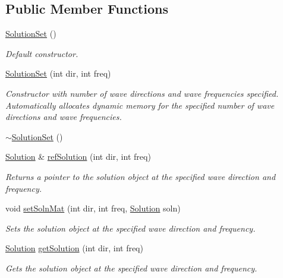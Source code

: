 \subsection*{Public Member Functions}
\begin{DoxyCompactItemize}
\item 
\hyperlink{classosea_1_1ofreq_1_1_solution_set_a0f7bf3b0ffbc11e1eea127614bf668a4}{Solution\-Set} ()
\begin{DoxyCompactList}\small\item\em Default constructor. \end{DoxyCompactList}\item 
\hyperlink{classosea_1_1ofreq_1_1_solution_set_ac4a508cd109ea0e7726aa47a3c868814}{Solution\-Set} (int dir, int freq)
\begin{DoxyCompactList}\small\item\em Constructor with number of wave directions and wave frequencies specified. Automatically allocates dynamic memory for the specified number of wave directions and wave frequencies. \end{DoxyCompactList}\item 
\hyperlink{classosea_1_1ofreq_1_1_solution_set_af016abf25e2e0ba50336449b12b88423}{$\sim$\-Solution\-Set} ()
\item 
\hyperlink{classosea_1_1ofreq_1_1_solution}{Solution} \& \hyperlink{classosea_1_1ofreq_1_1_solution_set_a5bbd01ec83ef72d924d13d9437407880}{ref\-Solution} (int dir, int freq)
\begin{DoxyCompactList}\small\item\em Returns a pointer to the solution object at the specified wave direction and frequency. \end{DoxyCompactList}\item 
void \hyperlink{classosea_1_1ofreq_1_1_solution_set_abfd970f3f5b875cdc193281c4a5f6f21}{set\-Soln\-Mat} (int dir, int freq, \hyperlink{classosea_1_1ofreq_1_1_solution}{Solution} soln)
\begin{DoxyCompactList}\small\item\em Sets the solution object at the specified wave direction and frequency. \end{DoxyCompactList}\item 
\hyperlink{classosea_1_1ofreq_1_1_solution}{Solution} \hyperlink{classosea_1_1ofreq_1_1_solution_set_aef977b8cf522b4d24cdd08df70d372f0}{get\-Solution} (int dir, int freq)
\begin{DoxyCompactList}\small\item\em Gets the solution object at the specified wave direction and frequency. \end{DoxyCompactList}\item 

\end{DoxyCompactItemize}
